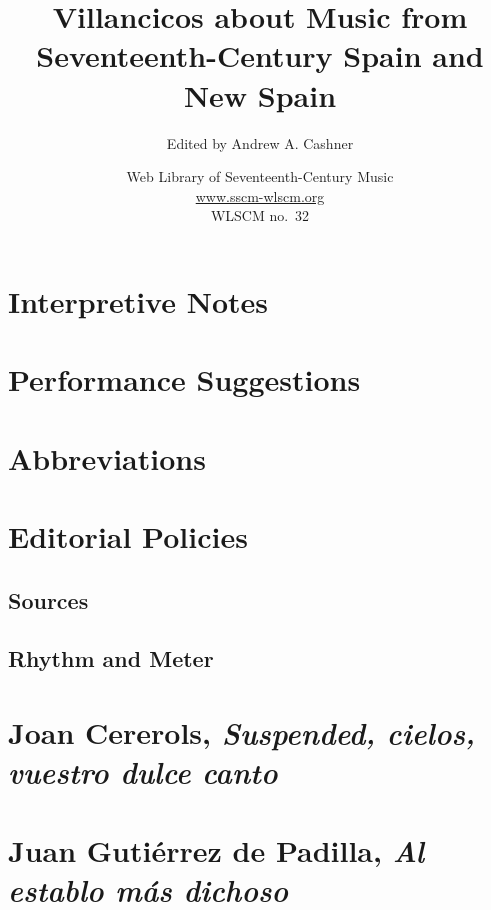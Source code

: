 \documentclass[12pt,oneside]{book}
\title{Villancicos about Music from 
Seventeenth-Century Spain and New Spain}
\author{Edited by Andrew A. Cashner}
\date{Web Library of Seventeenth-Century Music\\
\url{www.sscm-wlscm.org}\\
WLSCM no.~32\\[2ex]
\number\year}
\begin{document}
\frontmatter

\maketitle

\tableofcontents

\lipsum[1]

\section{Interpretive Notes}
\lipsum[1]

\section{Performance Suggestions}
\lipsum[1]


\section{Abbreviations}
\lipsum[1]

\section{Editorial Policies}
\lipsum[1]

\subsection{Sources}
\lipsum[1]

\subsection{Rhythm and Meter}
\lipsum[1]


\section{Joan Cererols, \emph{Suspended, cielos, vuestro dulce canto}}
\lipsum

\section{Juan Gutiérrez de Padilla, \emph{Al establo más dichoso}}
\lipsum

\end{document}
